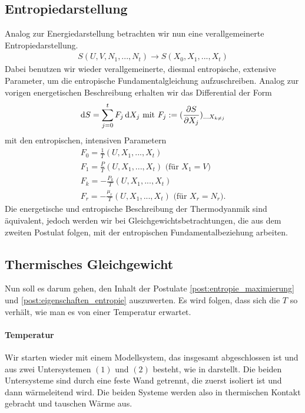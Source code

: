 \subsection{Entropiedarstellung}
Analog zur Energiedarstellung betrachten wir nun eine verallgemeinerte Entropiedarstellung.
\begin{align}
    S(U,V,N_1,...,N_t) \rightarrow S(X_0,X_1,...,X_t)
\end{align}
Dabei benutzen wir wieder verallgemeinerte, diesmal entropische, extensive Parameter, um die entropische Fundamentalgleichung aufzuschreiben. Analog zur vorigen energetischen Beschreibung erhalten wir das Differential der Form
\begin{align}
    \mathop{}\!\mathrm{d} S = \sum_{j=0}^tF_j\mathop{}\!\mathrm{d} X_j \text{ mit }F_j:=(\frac{\partial S}{\partial X_j})_{...X_{k\neq j}}
\end{align}
mit den entropischen, intensiven Parametern
\begin{align}
    F_0=\frac{1}{T}(U,X_1,...,X_t)\\
    F_1=\frac{P}{T}(U,X_1,...,X_t)\text{ (für $X_1=V$)}\\
    F_k=-\frac{P_k}{T}(U,X_1,...,X_t)\\
    F_r=-\frac{\mu_r}{T}(U,X_1,...,X_t) \text{ (für $X_r=N_r$)}. 
\end{align}
Die energetische und entropische Beschreibung der Thermodyanmik sind äquivalent, jedoch werden wir bei Gleichgewichtsbetrachtungen, die aus dem zweiten Postulat folgen, mit der entropischen Fundamentalbeziehung arbeiten.
\subsection{Thermisches Gleichgewicht}

Nun soll es darum gehen, den Inhalt der Postulate \ref{post:entropie_maximierung} und \ref{post:eigenschaften_entropie} auszuwerten. 
Es wird folgen, dass sich die $T$ so verhält, wie man es von einer Temperatur erwartet. 

\paragraph*{Temperatur}

Wir starten wieder mit einem Modellsystem, das insgesamt abgeschlossen ist und aus zwei Untersystemen $(1)$ und $(2)$ besteht, wie in  darstellt. 
Die beiden Untersysteme sind durch eine feste Wand getrennt, die zuerst isoliert ist und dann wärmeleitend wird. Die beiden Systeme werden also in thermischen Kontakt gebracht und tauschen Wärme aus. 

